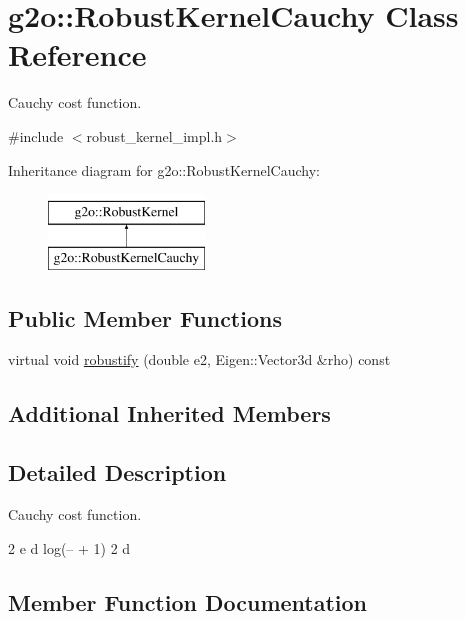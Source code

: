\hypertarget{classg2o_1_1_robust_kernel_cauchy}{}\section{g2o\+:\+:Robust\+Kernel\+Cauchy Class Reference}
\label{classg2o_1_1_robust_kernel_cauchy}


Cauchy cost function.  




{\ttfamily \#include $<$robust\+\_\+kernel\+\_\+impl.\+h$>$}

Inheritance diagram for g2o\+:\+:Robust\+Kernel\+Cauchy\+:\begin{figure}[H]
\begin{center}
\leavevmode
\includegraphics[height=2.000000cm]{classg2o_1_1_robust_kernel_cauchy}
\end{center}
\end{figure}
\subsection*{Public Member Functions}
\begin{DoxyCompactItemize}
\item 
virtual void \mbox{\hyperlink{classg2o_1_1_robust_kernel_cauchy_abec224380964f491c74ef173e7ae5afd}{robustify}} (double e2, Eigen\+::\+Vector3d \&rho) const
\end{DoxyCompactItemize}
\subsection*{Additional Inherited Members}


\subsection{Detailed Description}
Cauchy cost function. 

2 e d log(-- + 1) 2 d 

\subsection{Member Function Documentation}
\mbox{\label{classg2o_1_1_robust_kernel_cauchy_abec224380964f491c74ef173e7ae5afd}} 
